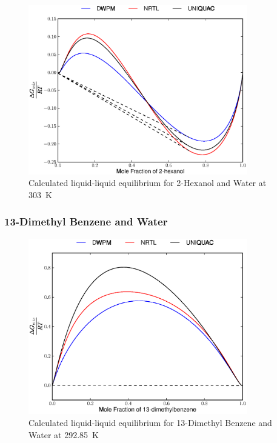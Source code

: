 \begin{figure}[hp]
\centering
\includegraphics[width = 0.85\textwidth]{Results_Parts/BinaryParams/2-hexanol-water/AllModelsGibbsPlots/T_303.eps}
\caption{Calculated liquid-liquid equilibrium for 2-Hexanol and Water at 303~$\mathrm{K}$} 
\end{figure}

\clearpage

\subsubsection*{13-Dimethyl Benzene and Water}

\begin{figure}[hp]
\centering
\includegraphics[width = 0.85\textwidth]{Results_Parts/BinaryParams/13-dimethylbenzene-water/AllModelsGibbsPlots/T_292.85.eps}
\caption{Calculated liquid-liquid equilibrium for 13-Dimethyl Benzene and Water at 292.85~$\mathrm{K}$} 
\end{figure}

